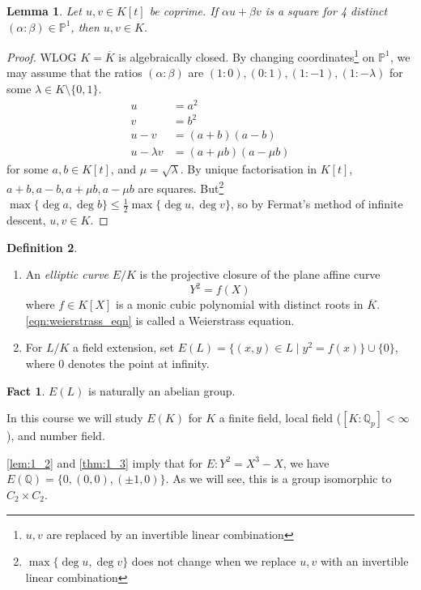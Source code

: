 \documentclass[11pt]{article}
\theoremstyle{definition}
\newtheorem{definition}{Definition}[section]
\newtheorem*{fact}{Fact}
\theoremstyle{plain}
\newtheorem{lemma}[definition]{Lemma}
\theoremstyle{remark}
\newcommand{\QQ}{\mathbb{Q}}
\newcommand{\PP}{\mathbb{P}}
\begin{document}
\begin{lemma}\label{lem:1_4}
    Let $u, v \in K[t]$ be coprime. If $\alpha u + \beta v$ is a square for 4 distinct $(\alpha : \beta) \in \PP^1$, then $u, v \in K$.
\end{lemma}
\begin{proof}
    WLOG $K = \overline{K}$ is algebraically closed. By changing coordinates\footnote{$u, v$ are replaced by an invertible linear combination} on $\PP^1$, we may assume that the ratios $(\alpha : \beta)$ are $(1 : 0), (0 : 1), (1 : -1), (1 : -\lambda)$ for some $\lambda \in K \setminus \{0,1\}$.
    \begin{align*}
        u &= a^2\\
        v &= b^2\\
        u-v &= (a+b)(a-b)\\
        u-\lambda v &= (a+\mu b)(a-\mu b)
    \end{align*}
    for some $a, b \in K[t]$, and $\mu = \sqrt{\lambda}$. By unique factorisation in $K[t]$, $a+b, a-b, a+\mu b, a-\mu b$ are squares. But\footnote{$\max\{\deg{u}, \deg{v}\}$ does not change when we replace $u, v$ with an invertible linear combination} $\max\{\deg{a}, \deg{b}\} \le \frac{1}{2} \max\{\deg{u}, \deg{v}\}$, so by Fermat's method of infinite descent, $u, v \in K$.
\end{proof}

\begin{definition}\label{def:1_5}\phantom{}
    \begin{enumerate}
        \item An \emph{elliptic curve} $E/K$ is the projective closure of the plane affine curve
            \begin{equation}\label{eqn:weierstrass_eqn}
                Y^2 = f(X)
            \end{equation}
            where $f \in K[X]$ is a monic cubic polynomial with distinct roots in $\overline{K}$. \eqref{eqn:weierstrass_eqn} is called a Weierstrass equation.

        \item For $L/K$ a field extension, set $E(L) = \{(x, y) \in L \mid y^2 = f(x)\} \cup \{0\}$, where $0$ denotes the point at infinity.
    \end{enumerate}
\end{definition}

\begin{fact}
    $E(L)$ is naturally an abelian group.
\end{fact}

In this course we will study $E(K)$ for $K$ a finite field, local field ($[K : \QQ_p] < \infty$), and number field.

\autoref{lem:1_2} and \autoref{thm:1_3} imply that for $E : Y^2 = X^3 - X$, we have $E(\QQ) = \{0, (0, 0), (\pm 1, 0)\}$. As we will see, this is a group isomorphic to $C_2 \times C_2$.
\end{document}
